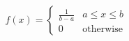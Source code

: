 \documentclass[preview]{standalone}
\begin{document}
\begin{align*}
f(x) = \begin{cases} \frac{1}{b-a} & a \leq x \leq b \\ 0 & \text{otherwise} \end{cases}
\end{align*}
\end{document}
